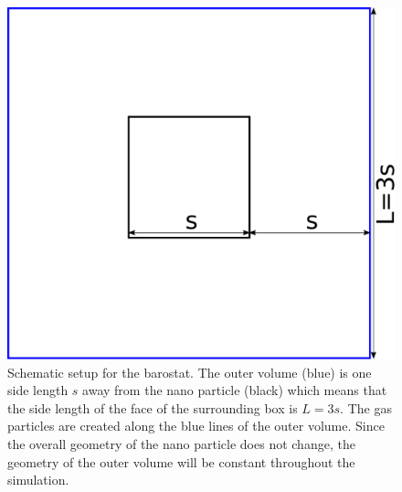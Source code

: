 \documentclass[12pt]{article}
\begin{document}
\begin{figure}[h]
    \begin{center}
        \includegraphics[scale=0.5]{images/gas_volume_ver3.pdf}
        \caption{Schematic setup for the barostat. The outer volume (blue) is one side length $s$ away from the nano particle (black) which means that
            the side length of the face of the surrounding box is $L=3s$. 
                    The gas particles are created along the blue lines of the outer volume. Since the overall geometry of the nano particle does 
                    not change, 
                    the geometry of the outer volume will be constant throughout the simulation.}
        \label{fig:gascube}
    \end{center}
\end{figure}


\end{document}
